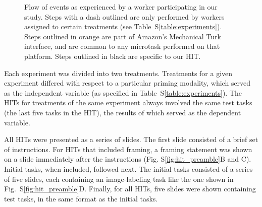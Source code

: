 \documentclass[12pt]{article}
\begin{document}
\begin{figure}
\begin{center}
	\caption{Flow of events as experienced by a worker participating in
		our study.  Steps with a dash outlined are only performed by 
		workers assigned to certain treatments 
		(see Table~S\ref{table:experiments}).  Steps outlined in orange are
		part of Amazon's Mechanical Turk interface, and are common to any 
		microtask performed on that platform.  Steps outlined in black are
		specific to our HIT.
	}
	\label{fig:task_schematic}
	\end{center}
\end{figure}

Each experiment was divided into two treatments.  Treatments for a given 
experiment differed with respect to a particular priming modality, which 
served as the independent variable
(as specified in Table~S\ref{table:experiments}).  
The HITs for treatments of the same experiment always involved the same
test tasks (the last five tasks in the HIT),
the results of which served as the dependent variable.

All HITs were presented as a series of slides.  The first 
slide consisted of a brief set of instructions.  For HITs that included 
framing, a framing statement was shown on a slide immediately after the 
instructions (Fig. S\ref{fig:hit_preamble}B and C).  
Initial tasks, when included, followed next.  The initial tasks consisted of 
a series of five slides, each containing an image-labeling task like the one 
shown in 
Fig.~S\ref{fig:hit_preamble}D.  Finally, for all HITs, five slides were shown
containing test tasks, in the same format as the initial tasks.
\end{document}
